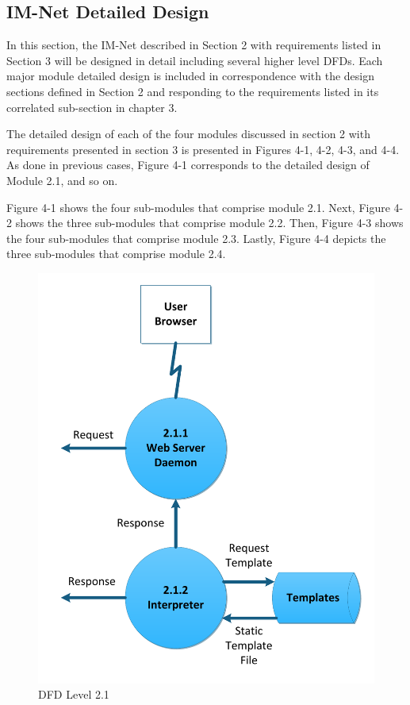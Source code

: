 \documentclass[letterpaper,12pt]{article}
\newcounter{qcounter}						%
\newcommand{\Section}[1]{\section{#1} \setcounter{figure}{0}}
\begin{document}
{\begin{list}{H -- :~}{}
\end{list}

\eject

\textcolor{section}{\Section{IM-Net Detailed Design}}

In this section, the IM-Net described in Section 2 with requirements listed in Section 3 will be designed in detail including several higher level DFDs. Each major module detailed design is included in correspondence with the design sections defined in Section 2 and responding to the requirements listed in its correlated sub-section in chapter 3.

The detailed design of each of the four modules discussed in section 2 with requirements presented in section 3 is presented in Figures 4-1, 4-2, 4-3, and 4-4. As done in previous cases, Figure 4-1 corresponds to the detailed design of Module 2.1, and so on.

Figure 4-1 shows the four sub-modules that comprise module 2.1. Next, Figure 4-2 shows the three sub-modules that comprise module 2.2. Then, Figure 4-3 shows the four sub-modules that comprise module 2.3. Lastly, Figure 4-4 depicts the three sub-modules that comprise module 2.4.

\begin{figure}[h!]
\centering
\includegraphics[scale=0.6]{DFD_level_2_1.pdf}
\caption{DFD Level 2.1}
\label{fig:DFD_level_2.1}
\end{figure}

}
\end{document}
